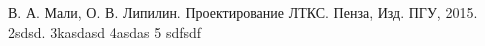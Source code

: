 \begin{thebibliography}
 В. А. Мали, О. В. Липилин. Проектирование ЛТКС. Пенза, Изд. ПГУ,  2015.
 2sdsd.
 3kasdasd
 4asdas
 5 sdfsdf
\end{thebibliography}
